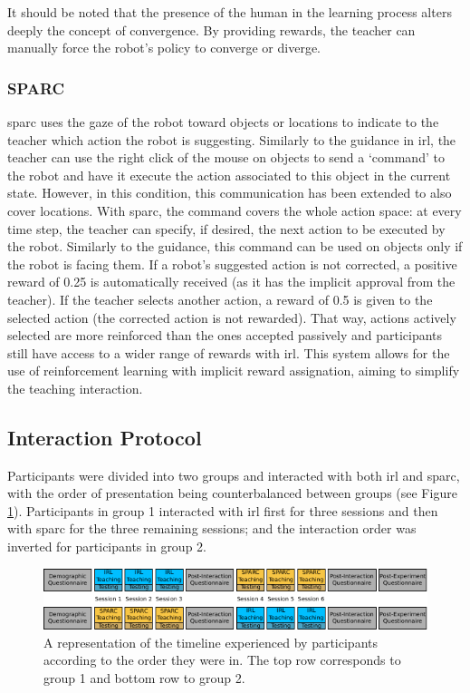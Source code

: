 It should be noted that the presence of the human in the learning process alters deeply the concept of convergence. By providing rewards, the teacher can manually force the robot's policy to converge or diverge.

\subsubsection{SPARC}

\gls{sparc} uses the gaze of the robot toward objects or locations to indicate to the teacher which action the robot is suggesting. Similarly to the guidance in \gls{irl}, the teacher can use the right click of the mouse on objects to send a `command' to the robot and have it execute the action associated to this object in the current state. However, in this condition, this communication has been extended to also cover locations. With \gls{sparc}, the command covers the whole action space: at every time step, the teacher can specify, if desired, the next action to be executed by the robot. Similarly to the guidance, this command can be used on objects only if the robot is facing them. If a robot's suggested action is not corrected, a positive reward of 0.25 is automatically received (as it has the implicit approval from the teacher). If the teacher selects another action, a reward of 0.5 is given to the selected action (the corrected action is not rewarded). That way, actions actively selected are more reinforced than the ones accepted passively and participants still have access to a wider range of rewards with \gls{irl}. This system allows for the use of reinforcement learning with implicit reward assignation, aiming to simplify the teaching interaction.

\subsection{Interaction Protocol}

Participants were divided into two groups and interacted with both \gls{irl} and \gls{sparc}, with the order of presentation being counterbalanced between groups (see Figure \ref{fig:control_design}). Participants in group 1 interacted with \gls{irl} first for three sessions and then with \gls{sparc} for the three remaining sessions; and the interaction order was inverted for participants in group 2. 

\begin{figure}[ht]
	\centering
	\includegraphics[width=1\textwidth]{protocol.pdf}
	\caption{A representation of the timeline experienced by participants according to the order they were in. The top row corresponds to group 1 and bottom row to group 2.}
	\label{fig:control_design}
\end{figure}

